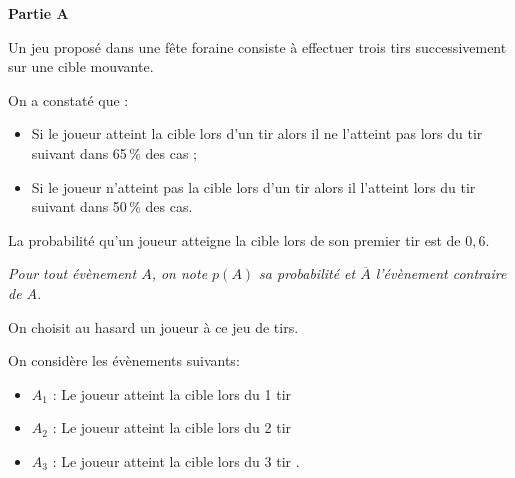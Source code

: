 \medskip

\textbf{Partie A}

\medskip

Un jeu proposé dans une fête foraine consiste à effectuer trois tirs successivement sur une cible mouvante.

On a constaté que :
\begin{itemize}
\item[$\bullet~~$] Si le joueur atteint la cible lors d'un tir alors il ne l'atteint pas lors du tir suivant dans 65\,\% des cas ;
\item[$\bullet~~$] Si le joueur n'atteint pas la cible lors d'un tir alors il l'atteint lors du tir suivant dans 50\,\% des cas.
\end{itemize}

La probabilité qu'un joueur atteigne la cible lors de son premier tir est de $0,6$.

\emph{Pour tout évènement $A$, on note $p(A)$ sa probabilité et $\overline{A}$ l'évènement contraire de $A$.}

On choisit au hasard un joueur à ce jeu de tirs.

On considère les évènements suivants:
\begin{itemize}
\item[$\bullet~~$] $A_1$ : \og Le joueur atteint la cible lors du 1 tir \fg
\item[$\bullet~~$] $A_2$ : \og Le joueur atteint la cible lors du 2 tir \fg
\item[$\bullet~~$] $A_3$ : \og Le joueur atteint la cible lors du 3 tir \fg.
\end{itemize}

\medskip

